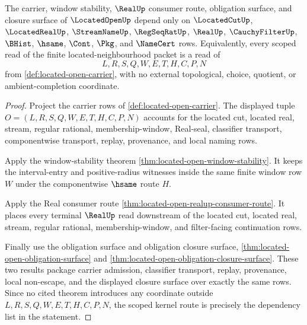 \begin{theorem}
\label{thm:located-open-scoped-kernel-route}
The carrier, window stability, $\RealUp$ consumer route, obligation surface,
and closure surface of $\LocatedOpenUp$ depend only on
$\LocatedCutUp$, $\LocatedRealUp$, $\StreamNameUp$, $\RegSeqRatUp$, $\RealUp$,
$\CauchyFilterUp$, $\BHist$, $\hsame$, $\Cont$, $\Pkg$, and $\NameCert$ rows.
Equivalently, every scoped read of the finite located-neighbourhood packet is
a read of
$$
L,R,S,Q,W,E,T,H,C,P,N
$$
from \autoref{def:located-open-carrier}, with no external topological,
choice, quotient, or ambient-completion coordinate.
\end{theorem}
\begin{proof}
Project the carrier rows of \autoref{def:located-open-carrier}. The displayed
tuple $O=(L,R,S,Q,W,E,T,H,C,P,N)$ accounts for the located cut, located real,
stream, regular rational, membership-window, Real-seal, classifier transport,
componentwise transport, replay, provenance, and local naming rows.

Apply the window-stability theorem
\autoref{thm:located-open-window-stability}. It keeps the interval-entry and
positive-radius witnesses inside the same finite window row $W$ under the
componentwise $\hsame$ route $H$.

Apply the Real consumer route
\autoref{thm:located-open-realup-consumer-route}. It places every terminal
$\RealUp$ read downstream of the located cut, located real, stream, regular
rational, membership-window, and filter-facing continuation rows.

Finally use the obligation surface and obligation closure surface,
\autoref{thm:located-open-obligation-surface} and
\autoref{thm:located-open-obligation-closure-surface}. These two results
package carrier admission, classifier transport, replay, provenance, local
non-escape, and the displayed closure surface over exactly the same rows.
Since no cited theorem introduces any coordinate outside
$L,R,S,Q,W,E,T,H,C,P,N$, the scoped kernel route is precisely the dependency
list in the statement.
\end{proof}

